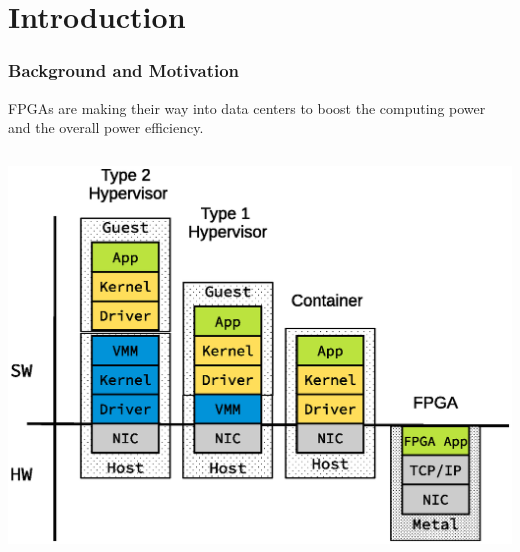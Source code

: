 \section{Introduction}
\begin{frame}
  \frametitle{Background and Motivation}

FPGAs are making their way into data centers to boost the computing power
	and the overall power efficiency.




\begin{columns}
\begin{column}{0.8\textwidth}
%
\includegraphics[scale=0.5]{./background/server_configuration.eps}
%
\end{column}


\end{columns}
\end{frame}
